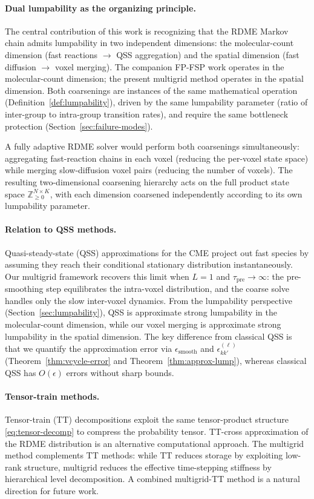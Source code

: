 \documentclass[review,onefignum,onetabnum]{siamart171218}
\newcommand{\Znn}{\mathbb{Z}_{\geq 0}}
\begin{document}
\paragraph{Dual lumpability as the organizing principle.}
The central contribution of this work is recognizing that the RDME
Markov chain admits lumpability in two independent dimensions:
the molecular-count dimension (fast reactions $\to$ QSS
aggregation) and the spatial dimension (fast diffusion $\to$
voxel merging).  The companion FP-FSP work \cite{Dhumuntarao2024}
operates in the molecular-count dimension; the present multigrid
method operates in the spatial dimension.  Both coarsenings are
instances of the same mathematical operation
(Definition~\ref{def:lumpability}), driven by the same
lumpability parameter (ratio of inter-group to intra-group
transition rates), and require the same bottleneck protection
(Section~\ref{sec:failure-modes}).

A fully adaptive RDME solver would perform both coarsenings
simultaneously: aggregating fast-reaction chains in each voxel
(reducing the per-voxel state space) while merging slow-diffusion
voxel pairs (reducing the number of voxels).  The resulting
two-dimensional coarsening hierarchy acts on the full product
state space $\Znn^{N \times K}$, with each dimension coarsened
independently according to its own lumpability parameter.

\paragraph{Relation to QSS methods.}
Quasi-steady-state (QSS) approximations for the CME \cite{peles}
project out fast species by assuming they reach their conditional
stationary distribution instantaneously.  Our multigrid framework
recovers this limit when $L=1$ and $\tau_{\mathrm{pre}} \to \infty$:
the pre-smoothing step equilibrates the intra-voxel distribution,
and the coarse solve handles only the slow inter-voxel dynamics.
From the lumpability perspective (Section~\ref{sec:lumpability}),
QSS is approximate strong lumpability in the molecular-count
dimension, while our voxel merging is approximate strong
lumpability in the spatial dimension.  The key difference from
classical QSS is that we quantify the approximation error via
$\epsilon_{\mathrm{smooth}}$ and $\epsilon_{kk'}^{(\ell)}$
(Theorem~\ref{thm:vcycle-error} and
Theorem~\ref{thm:approx-lump}), whereas classical QSS has
$O(\epsilon)$ errors without sharp bounds.

\paragraph{Tensor-train methods.}
Tensor-train (TT) decompositions \cite{Kazeev2014} exploit the
same tensor-product structure \eqref{eq:tensor-decomp} to
compress the probability tensor.  TT-cross approximation of the
RDME distribution is an alternative computational approach.  The
multigrid method complements TT methods: while TT reduces storage
by exploiting low-rank structure, multigrid reduces the effective
time-stepping stiffness by hierarchical level decomposition.  A
combined multigrid-TT method is a natural direction for future
work.
\end{document}
